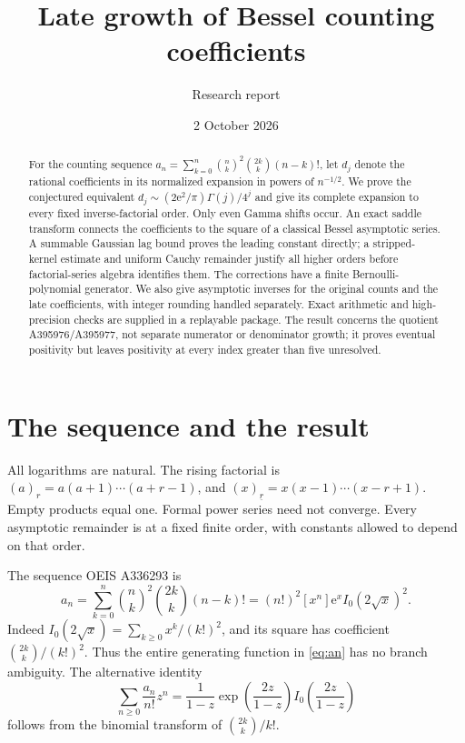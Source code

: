\documentclass[11pt,letterpaper]{article}
\title{Late growth of Bessel counting coefficients}
\author{Research report}
\date{2 October 2026}
\numberwithin{equation}{section}
\theoremstyle{remark}\newtheorem{remark}[theorem]{Remark}
\newcommand{\e}{\mathrm e}
\newcommand{\fall}[2]{(#1)_{\underline{#2}}}
\begin{document}
\maketitle
\begin{abstract}
For the counting sequence $a_n=\sum_{k=0}^n\binom nk^2\binom{2k}k(n-k)!$, let $d_j$ denote the rational coefficients in its normalized expansion in powers of $n^{-1/2}$. We prove the conjectured equivalent $d_j\sim(2\e^2/\pi)\Gamma(j)/4^j$ and give its complete expansion to every fixed inverse-factorial order. Only even Gamma shifts occur. An exact saddle transform connects the coefficients to the square of a classical Bessel asymptotic series. A summable Gaussian lag bound proves the leading constant directly; a stripped-kernel estimate and uniform Cauchy remainder justify all higher orders before factorial-series algebra identifies them. The corrections have a finite Bernoulli-polynomial generator. We also give asymptotic inverses for the original counts and the late coefficients, with integer rounding handled separately. Exact arithmetic and high-precision checks are supplied in a replayable package. The result concerns the quotient A395976/A395977, not separate numerator or denominator growth; it proves eventual positivity but leaves positivity at every index greater than five unresolved.
\end{abstract}

\section{The sequence and the result}
All logarithms are natural. The rising factorial is $(a)_r=a(a+1)\cdots(a+r-1)$, and $\fall{x}{r}=x(x-1)\cdots(x-r+1)$. Empty products equal one. Formal power series need not converge. Every asymptotic remainder is at a fixed finite order, with constants allowed to depend on that order.

The sequence OEIS A336293 is
\begin{equation}\label{eq:an}
 a_n=\sum_{k=0}^n\binom nk^2\binom{2k}k(n-k)!
     =(n!)^2[x^n]\e^x I_0(2\sqrt{x})^2.
\end{equation}
Indeed $I_0(2\sqrt{x})=\sum_{k\ge0}x^k/(k!)^2$, and its square has coefficient $\binom{2k}k/(k!)^2$. Thus the entire generating function in \eqref{eq:an} has no branch ambiguity. The alternative identity
\begin{equation}\label{eq:egf}
 \sum_{n\ge0}\frac{a_n}{n!}z^n
 =\frac1{1-z}\exp\!\left(\frac{2z}{1-z}\right)
     I_0\!\left(\frac{2z}{1-z}\right)
\end{equation}
follows from the binomial transform of $\binom{2k}k/k!$.
\end{document}
